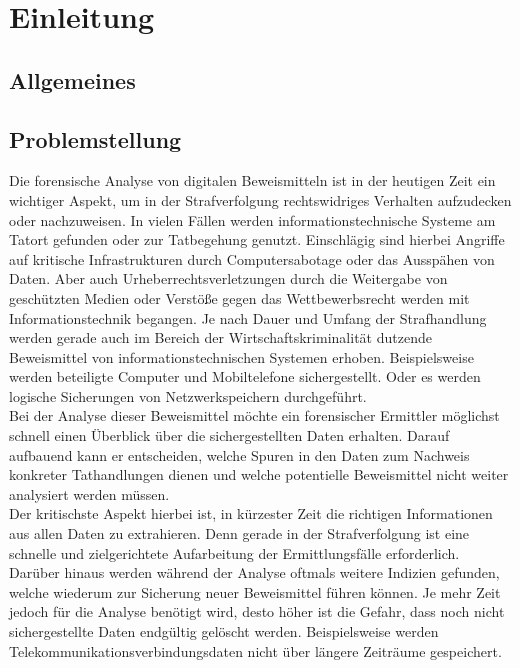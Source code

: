 \documentclass[11pt,a4paper]{report} %
\begin{document}
\tableofcontents

\chapter{Einleitung}
\label{ch:einleitung}
\section{Allgemeines}

\section{Problemstellung}
Die forensische Analyse von digitalen Beweismitteln ist in der heutigen Zeit ein wichtiger Aspekt, um in der Strafverfolgung rechtswidriges Verhalten aufzudecken oder nachzuweisen. In vielen Fällen werden informationstechnische Systeme am Tatort gefunden oder zur Tatbegehung genutzt. Einschlägig sind hierbei Angriffe auf kritische Infrastrukturen durch Computersabotage oder das Ausspähen von Daten. Aber auch Urheberrechtsverletzungen durch die Weitergabe von geschützten Medien oder Verstöße gegen das Wettbewerbsrecht werden mit Informationstechnik begangen.
Je nach Dauer und Umfang der Strafhandlung werden gerade auch im Bereich der Wirtschaftskriminalität dutzende Beweismittel von informationstechnischen Systemen erhoben. Beispielsweise werden beteiligte Computer und Mobiltelefone sichergestellt. Oder es werden logische Sicherungen von Netzwerkspeichern durchgeführt.\\

\noindent
Bei der Analyse dieser Beweismittel möchte ein forensischer Ermittler möglichst schnell einen Überblick über die sichergestellten Daten erhalten. Darauf aufbauend kann er entscheiden, welche Spuren in den Daten zum Nachweis konkreter Tathandlungen dienen und welche potentielle Beweismittel nicht weiter analysiert werden müssen.\\

\noindent
Der kritischste Aspekt hierbei ist, in kürzester Zeit die richtigen Informationen aus allen Daten zu extrahieren. Denn gerade in der Strafverfolgung ist eine schnelle und zielgerichtete Aufarbeitung der Ermittlungsfälle erforderlich. Darüber hinaus werden während der Analyse oftmals weitere Indizien gefunden, welche wiederum zur Sicherung neuer Beweismittel führen können. Je mehr Zeit jedoch für die Analyse benötigt wird, desto höher ist die Gefahr, dass noch nicht sichergestellte Daten endgültig gelöscht werden. Beispielsweise werden Telekommunikationsverbindungsdaten nicht über längere Zeiträume gespeichert.\\
\end{document}
